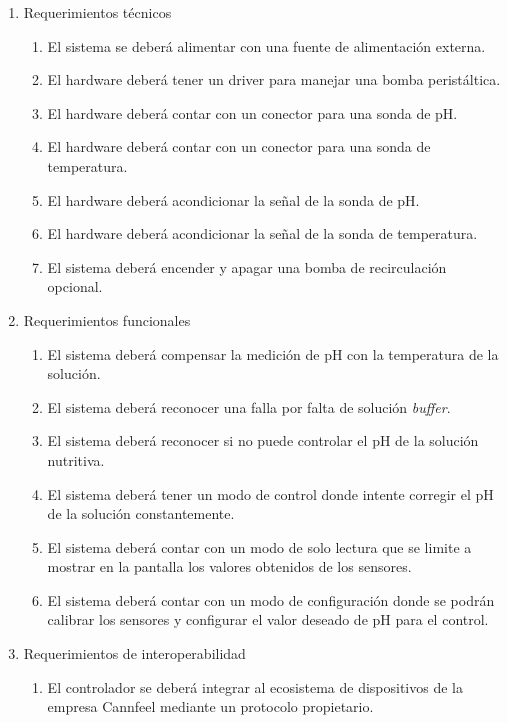 \documentclass[
11pt, %
codirector, %
]{charter}
\begin{document}
\begin{enumerate}
	\item Requerimientos técnicos
		\begin{enumerate}
			\item El sistema se deberá alimentar con una fuente de alimentación externa.
			\item El hardware deberá tener un driver para manejar una bomba peristáltica.
			\item El hardware deberá contar con un conector para una sonda de pH.
			\item El hardware deberá contar con un conector para una sonda de temperatura.
			\item El hardware deberá acondicionar la señal de la sonda de pH.
			\item El hardware deberá acondicionar la señal de la sonda de temperatura.
			\item El sistema deberá encender y apagar una bomba de recirculación opcional.
		\end{enumerate}
		
	\item Requerimientos funcionales
		\begin{enumerate}
			\item El sistema deberá compensar la medición de pH con la temperatura de la solución.
			\item El sistema deberá reconocer una falla por falta de solución \textit{buffer}.
			\item El sistema deberá reconocer si no puede controlar el pH de la solución nutritiva.
			\item El sistema deberá tener un modo de control donde intente corregir el pH de la solución constantemente.
			\item El sistema deberá contar con un modo de solo lectura que se limite a mostrar en la pantalla los valores obtenidos de los sensores.
			\item El sistema deberá contar con un modo de configuración donde se podrán calibrar los sensores y configurar el valor deseado de pH para el control.
		\end{enumerate}
		
	\item Requerimientos de interoperabilidad
		\begin{enumerate}
			\item El controlador se deberá integrar al ecosistema de dispositivos de la empresa Cannfeel mediante un protocolo propietario.
		\end{enumerate}	
		

\end{enumerate}
\end{document}
